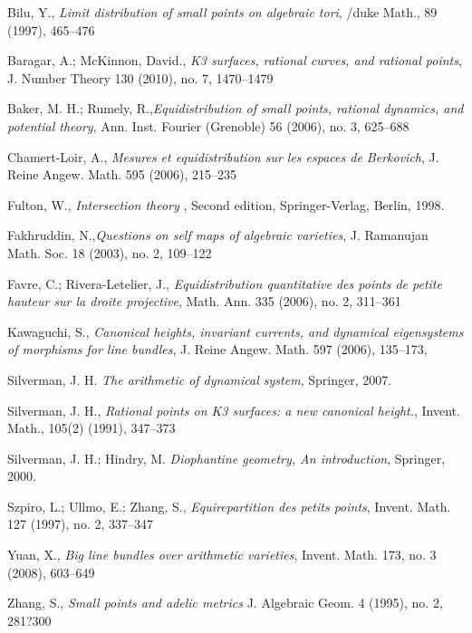 \documentclass[11pt,letterpaper]{amsart}
\begin{document}
    \begin{thebibliography}{ABCDEFG}

        Bilu, Y., {\em Limit distribution of small points on algebraic tori}, /duke Math., 89 (1997), 465--476

        Baragar, A.; McKinnon, David., {\em K3 surfaces, rational curves, and rational points}, J. Number Theory 130 (2010), no. 7, 1470--1479

        Baker, M. H.; Rumely, R.,{\em Equidistribution of small points, rational dynamics, and potential theory}, Ann. Inst. Fourier (Grenoble) 56 (2006), no. 3, 625--688

        Chamert-Loir, A., {\em Mesures et equidistribution sur les espaces de Berkovich}, J. Reine Angew. Math. 595 (2006), 215--235

             Fulton, W., {\em Intersection theory },  Second edition, Springer-Verlag, Berlin, 1998.

            Fakhruddin, N.,{\em  Questions on self maps of algebraic varieties}, J. Ramanujan Math. Soc. 18 (2003), no. 2, 109--122

            Favre, C.; Rivera-Letelier, J., {\em Equidistribution quantitative des points de petite hauteur sur la droite projective}, Math. Ann. 335 (2006), no. 2, 311--361

        Kawaguchi, S., {\em Canonical heights, invariant currents, and dynamical eigensystems of morphisms for line bundles}, J. Reine Angew. Math. 597 (2006), 135--173,

            Silverman, J. H. {\em The arithmetic of dynamical system}, Springer, 2007.

            Silverman, J. H., {\em Rational points on K3 surfaces: a new canonical height.}, Invent. Math., 105(2) (1991), 347--373

            Silverman, J. H.; Hindry, M. {\em Diophantine geometry, An introduction}, Springer, 2000.

            Szpiro, L.; Ullmo, E.; Zhang, S., {\em Equirepartition des petits points}, Invent. Math. 127 (1997), no. 2, 337--347

           Yuan, X., {\em Big line bundles over arithmetic varieties}, Invent. Math. 173, no. 3 (2008), 603--649

           Zhang, S., {\em  Small points and adelic metrics} J. Algebraic Geom. 4 (1995), no. 2, 281?300
    \end{thebibliography}
\end{document}
